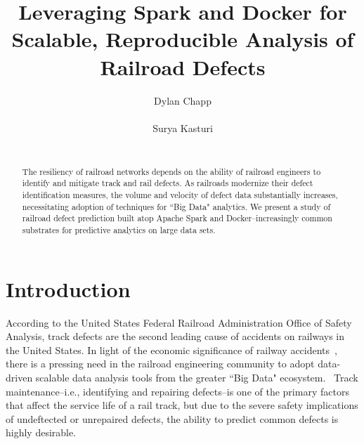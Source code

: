 \documentclass{sig-alternate-05-2015}
\begin{document}





%

\title{Leveraging Spark and Docker for Scalable, Reproducible Analysis of Railroad Defects}

\author{
\alignauthor
Dylan Chapp\\
       \\
\alignauthor
Surya Kasturi\\
       \\
}

\maketitle
\begin{abstract}
The resiliency of railroad networks depends on the ability of railroad 
engineers to identify and mitigate track and rail defects. As railroads
modernize their defect identification measures, the volume and velocity of 
defect data substantially increases, necessitating adoption of techniques
for ``Big Data" analytics. We present a study of railroad defect prediction 
built atop Apache Spark and Docker--increasingly common substrates for 
predictive analytics on large data sets. 
\end{abstract}

\section{Introduction}
According to the United States Federal Railroad Administration Office of Safety Analysis, track defects are the second leading cause of accidents on railways in the United States.
In light of the economic significance of railway accidents~\cite{Schafer:08}, there is a pressing need in the railroad engineering community to adopt data-driven scalable data analysis tools from the greater ``Big Data" ecosystem.~\cite{Zarembski:14} 
Track maintenance--i.e., identifying and repairing defects--is one of the primary factors that affect the service life of a rail track, but due to the severe safety implications of undeftected or unrepaired defects, the ability to predict common defects is highly desirable. 
\end{document}
